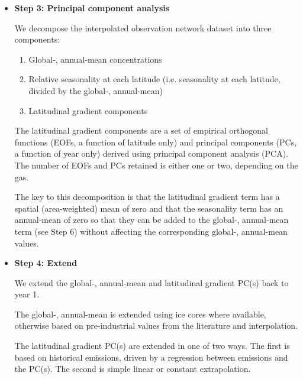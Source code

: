\begin{itemize}
{         We then extract the longest time period in our spatially interpolated dataset
         over which there are no data gaps
         (gaps can appear if a time point in the middle of the record failed the minimum requirement for spatial interpolation,
         which is why we cannot simply use the timespan of the observational record itself).
         We refer to the result as the `interpolated observation network dataset'
         and to the time period it covers as the `interpolated observation network period'.
    }

    \item {
        \textbf{Step 3: Principal component analysis}

        We decompose the interpolated observation network dataset into three components:

        \begin{enumerate}
            \item Global-, annual-mean concentrations
            \item Relative seasonality at each latitude (i.e. seasonality at each latitude, divided by the global-, annual-mean)
            \item Latitudinal gradient components
        \end{enumerate}

        The latitudinal gradient components are a set of empirical orthogonal functions (EOFs, a function of latitude only)
        and principal components (PCs, a function of year only) derived using principal component analysis (PCA).
        The number of EOFs and PCs retained is either one or two, depending on the gas.

        The key to this decomposition is that the latitudinal gradient term
        has a spatial (area-weighted) mean of zero
        and that the seasonality term has an annual-mean of zero
        so that they can be added to the global-, annual-mean term (see Step 6)
        without affecting the corresponding global-, annual-mean values.
    }

    \item {
        \textbf{Step 4: Extend}

        We extend the global-, annual-mean and latitudinal gradient PC(s) back to year 1.

        The global-, annual-mean is extended using ice cores where available,
        otherwise based on pre-industrial values from the literature and interpolation.

        The latitudinal gradient PC(s) are extended in one of two ways.
        The first is based on historical emissions, driven by a regression between emissions and the PC(s).
        The second is simple linear or constant extrapolation.
    }


\end{itemize}
